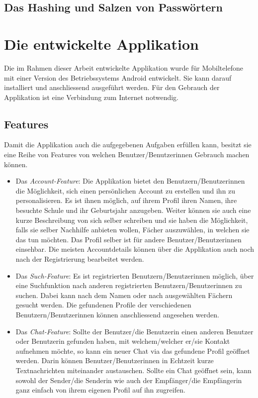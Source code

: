 \documentclass[a4paper,11pt]{report}
\begin{document}
		\section{Das Hashing und Salzen von Passwörtern}
		
		
	\chapter{Die entwickelte Applikation}
	Die im Rahmen dieser Arbeit entwickelte Applikation wurde für Mobiltelefone mit einer Version des Betriebssystems Android entwickelt. Sie kann darauf installiert und anschliessend ausgeführt werden. Für den Gebrauch der Applikation ist eine Verbindung zum Internet notwendig.
	
	\section{Features}
	Damit die Applikation auch die aufgegebenen Aufgaben erfüllen kann, besitzt sie eine Reihe von Features von welchen Benutzer/Benutzerinnen Gebrauch machen können.
	
	\begin{itemize}
		\item Das \emph{Account-Feature}: Die Applikation bietet den Benutzern/Benutzerinnen die Möglichkeit, sich einen persönlichen Account zu erstellen und ihn zu personalisieren. Es ist ihnen möglich, auf ihrem Profil ihren Namen, ihre besuchte Schule und ihr Geburtsjahr anzugeben. Weiter können sie auch eine kurze Beschreibung von sich selber schreiben und sie haben die Möglichkeit, falls sie selber Nachhilfe anbieten wollen, Fächer auszuwählen, in welchen sie das tun möchten. Das Profil selber ist für andere Benutzer/Benutzerinnen einsehbar. Die meisten Accountdetails können über die Applikation auch noch nach der Registrierung bearbeitet werden.
		\item Das \emph{Such-Feature}: Es ist registrierten Benutzern/Benutzerinnen möglich, über eine Suchfunktion nach anderen registrierten Benutzern/Benutzerinnen zu suchen. Dabei kann nach dem Namen oder nach ausgewählten Fächern gesucht werden. Die gefundenen Profile der verschiedenen Benutzern/Benutzerinnen können anschliessend angesehen werden.
		\item Das \emph{Chat-Feature}: Sollte der Benutzer/die Benutzerin einen anderen Benutzer oder Benutzerin gefunden haben, mit welchem/welcher er/sie Kontakt aufnehmen möchte, so kann ein neuer Chat via das gefundene Profil geöffnet werden. Darin können Benutzer/Benutzerinnen in Echtzeit kurze Textnachrichten miteinander austauschen. Sollte ein Chat geöffnet sein, kann sowohl der Sender/die Senderin wie auch der Empfänger/die Empfängerin ganz einfach von ihrem eigenen Profil auf ihn zugreifen.
	\end{itemize}
\end{document}

